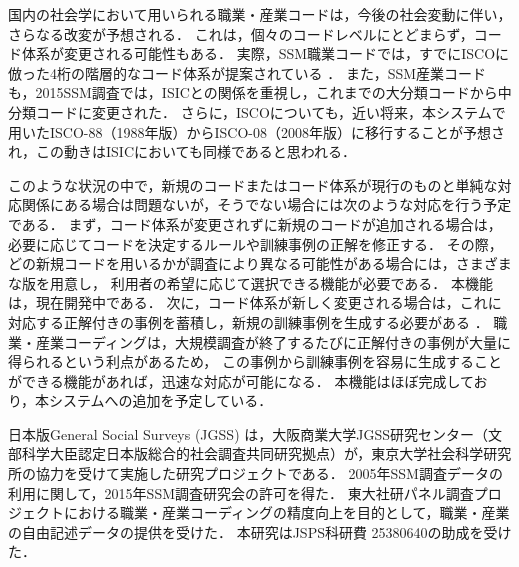 \documentclass[japanese]{jnlp_1.4}
\begin{document}
国内の社会学において用いられる職業・産業コードは，今後の社会変動に伴い，さらなる改変が予想される．
これは，個々のコードレベルにとどまらず，コード体系が変更される可能性もある．
実際，SSM職業コードでは，すでにISCOに倣った4桁の階層的なコード体系が提案されている \cite{Miwa11}．
また，SSM産業コードも，2015SSM調査では，ISICとの関係を重視し，これまでの大分類コードから中分類コードに変更された．
さらに，ISCOについても，近い将来，本システムで用いたISCO-88（1988年版）からISCO-08（2008年版）に移行することが予想され，この動きはISICにおいても同様であると思われる．

このような状況の中で，新規のコードまたはコード体系が現行のものと単純な対応関係にある場合は問題ないが，そうでない場合には次のような対応を行う予定である．
まず，コード体系が変更されずに新規のコードが追加される場合は，必要に応じてコードを決定するルールや訓練事例の正解を修正する．
その際，どの新規コードを用いるかが調査により異なる可能性がある場合には，さまざまな版を用意し， 利用者の希望に応じて選択できる機能が必要である．
本機能は，現在開発中である．
次に，コード体系が新しく変更される場合は，これに対応する正解付きの事例を蓄積し，新規の訓練事例を生成する必要がある \cite{Takahashi16}．
職業・産業コーディングは，大規模調査が終了するたびに正解付きの事例が大量に得られるという利点があるため， この事例から訓練事例を容易に生成することができる機能があれば，迅速な対応が可能になる．
本機能はほぼ完成しており，本システムへの追加を予定している．


\acknowledgment

日本版General Social Surveys (JGSS) は，大阪商業大学JGSS研究センター（文部科学大臣認定日本版総合的社会調査共同研究拠点）が，東京大学社会科学研究所の協力を受けて実施した研究プロジェクトである．
2005年SSM調査データの利用に関して，2015年SSM調査研究会の許可を得た．
東大社研パネル調査プロジェクトにおける職業・産業コーディングの精度向上を目的として，職業・産業の自由記述データの提供を受けた．
本研究はJSPS科研費 25380640の助成を受けた．
\end{document}
